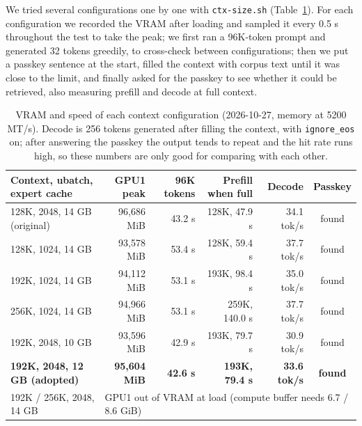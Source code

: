 \documentclass[11pt,a4paper]{article}
\newcommand{\code}[1]{\texttt{#1}}
\newcommand{\tps}{tok/s}
\begin{document}
We tried several configurations one by one with \code{ctx-size.sh} (Table~\ref{tab:ctx}). For each configuration we recorded the VRAM after loading and sampled it every 0.5 s throughout the test to take the peak; we first ran a 96K-token prompt and generated 32 tokens greedily, to cross-check between configurations; then we put a passkey sentence at the start, filled the context with corpus text until it was close to the limit, and finally asked for the passkey to see whether it could be retrieved, also measuring prefill and decode at full context.

\begin{table}[h]
  \centering
  \small
  \caption{VRAM and speed of each context configuration (2026-10-27, memory at 5200 MT/s). Decode is 256 tokens generated after filling the context, with \code{ignore\_eos} on; after answering the passkey the output tends to repeat and the hit rate runs high, so these numbers are only good for comparing with each other.}
  \label{tab:ctx}
  \begin{tabular}{@{}l r r r r c@{}}
    \toprule
    Context, ubatch, expert cache & GPU1 peak & 96K tokens & Prefill when full & Decode & Passkey \\
    \midrule
    128K, 2048, 14 GB (original) & 96,686 MiB & 43.2 s & 128K, 47.9 s & 34.1 \tps{} & found \\
    128K, 1024, 14 GB & 93,578 MiB & 53.4 s & 128K, 59.4 s & 37.7 \tps{} & found \\
    192K, 1024, 14 GB & 94,112 MiB & 53.1 s & 193K, 98.4 s & 35.0 \tps{} & found \\
    256K, 1024, 14 GB & 94,966 MiB & 53.1 s & 259K, 140.0 s & 37.7 \tps{} & found \\
    192K, 2048, 10 GB & 93,596 MiB & 42.9 s & 193K, 79.7 s & 30.9 \tps{} & found \\
    \textbf{192K, 2048, 12 GB (adopted)} & \textbf{95,604 MiB} & \textbf{42.6 s} & \textbf{193K, 79.4 s} & \textbf{33.6 \tps{}} & \textbf{found} \\
    192K / 256K, 2048, 14 GB & \multicolumn{5}{l}{GPU1 out of VRAM at load (compute buffer needs 6.7 / 8.6 GiB)} \\
    \bottomrule
  \end{tabular}
\end{table}
\end{document}
